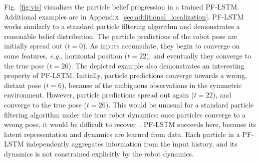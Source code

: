 \documentclass[letterpaper]{article} %
\begin{document}
Fig.~\ref{fig:vis}  visualizes the particle belief progression in a trained PF-LSTM. 
Additional examples are in Appendix~\ref{sec:additional_localization}.
PF-LSTM works similarly to a standard particle filtering algorithm and demonstrates a reasonable belief distribution. The particle predictions of the robot pose are initially spread out ($t=0$). As inputs accumulate, they begin to converge on some features, \textit{e.g.}, horizontal position ($t=22$); and eventually they converge to the true pose ($t=26$). The depicted example also demonstrates an interesting property of PF-LSTM. Initially, particle predictions converge towards a wrong, distant pose ($t=6$), because of the ambiguous observations in the symmetric environment. However, particle predictions spread out again ($t=22$), and converge to the true pose ($t=26$). 
This would be unusual for a standard particle filtering algorithm under the true robot dynamics: once particles converge to a wrong pose, it would be difficult to recover~\cite{thrun2001robust}. 
PF-LSTM succeeds here, because its latent representation and dynamics are learned from data.  Each particle in a PF-LSTM  independently aggregates information from the input history, and its dynamics is not constrained explicitly by the robot dynamics.
\end{document}
